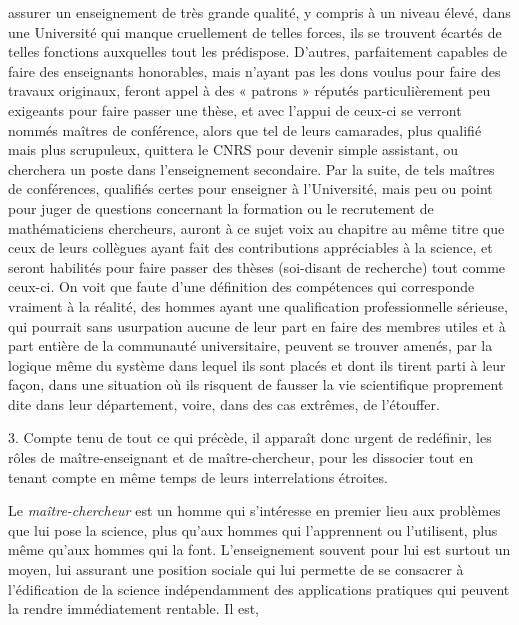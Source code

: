 \documentclass[11pt,a4paper]{article}
\begin{document}
assurer un enseignement de très grande qualité, y compris à un niveau
élevé, dans une Université qui manque cruellement de telles forces, ils
se trouvent écartés de telles fonctions auxquelles tout les prédispose.
D'autres, parfaitement capables de faire des enseignants honorables, mais
n'ayant pas les dons voulus pour faire des travaux originaux, feront appel
à des « patrons » réputés particulièrement peu exigeants pour faire passer
une thèse, et avec l'appui de ceux-ci se verront nommés maîtres de conférence,
alors que tel de leurs camarades, plus qualifié mais plus scrupuleux,
quittera le CNRS pour devenir simple assistant, ou cherchera un poste dans
l'enseignement secondaire. Par la suite, de tels maîtres de conférences,
qualifiés certes pour enseigner à l'Université, mais peu ou point pour juger
de questions concernant la formation ou le recrutement de mathématiciens
chercheurs, auront à ce sujet voix au chapitre au même titre que ceux de
leurs collègues ayant fait des contributions appréciables à la science, et
seront habilités pour faire passer des thèses (soi-disant de recherche)
tout comme ceux-ci. On voit que faute d'une définition des compétences qui
corresponde vraiment à la réalité, des hommes ayant une qualification
professionnelle sérieuse, qui pourrait sans usurpation aucune de leur part en
faire des membres utiles et à part entière de la communauté universitaire,
peuvent se trouver amenés, par la logique même du système dans lequel ils
sont placés et dont ils tirent parti à leur façon, dans une situation où
ils risquent de fausser la vie scientifique proprement dite dans leur
département, voire, dans des cas extrêmes, de l'étouffer.

3. Compte tenu de tout ce qui précède, il apparaît donc urgent de redéfinir,
les rôles de maître-enseignant et de maître-chercheur, pour les dissocier
tout en tenant compte en même temps de leurs interrelations étroites.

Le \emph{maître-chercheur} est un homme qui s'intéresse en premier lieu
aux problèmes que lui pose la science, plus qu'aux hommes qui l'apprennent
ou l'utilisent, plus même qu'aux hommes qui la font. L'enseignement souvent
pour lui est surtout un moyen, lui assurant une position sociale qui lui
permette de se consacrer à l'édification de la science indépendamment des
applications pratiques qui peuvent la rendre immédiatement rentable. Il est,
\end{document}
